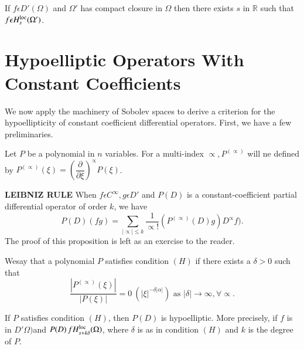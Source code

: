 \setcounter{coro}{24}
\begin{coro}\label{chap3:sec1:coro3.25}%
  If $f \epsilon D' (\Omega)$ and $\Omega'$ has compact closure
  in $\Omega$ then there exists $s$ in $\mathbb{R}$ such that $f
  \epsilon H^{\operatorname{loc}}_s(\Omega')$.   
\end{coro}

\section[Hypoelliptic Operators With Constant
  Coeffi\-cients]{Hypoelliptic Operators With Constant\hfill\break
  Coeffi\-cients}\label{chap3:sec2} %

We now apply the machinery of Sobolev spaces to derive a criterion
for the hypoellipticity of constant coefficient differential
operators. First, we have a few preliminaries.  

\setcounter{defi}{25}
\begin{defi} \label{chap3:sec2:def3.26}%
  Let $P$ be a polynomial in $n$ variables. For a multi-index $\propto,
  P^{(\propto)}$ will ne defined by $P^{(\propto)}(\xi) =
  (\dfrac{\partial}{\partial \xi})^\propto P(\xi) $.  
\end{defi}

\setcounter{prop}{26}
\begin{prop} \label{chap3:sec2:prop3.27}%
  \textbf{LEIBNIZ RULE} When $f \epsilon C^\infty, g
  \epsilon D'$ and $P(D)$ is a constant-coefficient partial
  differential operator of order $k$, we have  
$$
P(D) (fg)  = \sum_{|\propto| \leq k } \dfrac{1}{\propto !}
(P^{(\propto)} (D)g) D^\propto f). 
$$
The proof of this proposition is left as an exercise to the reader. 
\end{prop}

\setcounter{defi}{27}
\begin{defi}\label{chap3:sec2:def3.28} %
  We\pageoriginale say that a polynomial $P$ satisfies condition $(H)$ if there
  exists a $\delta > 0$ such that  
  $$
  \frac{|P^{(\propto)}(\xi)|}{|P(\xi)|}= 0~
  (|\xi|^{-\delta|\alpha|})\text{ as }|\delta| \to \infty, \forall
  \propto.  
  $$
\end{defi}

\setcounter{thm}{28}
\begin{thm}[H\"{O}RMANDER]\label{chap3:sec2:def3.29}%
  If $P$ satisfies condition $(H)$,
    then $P(D)$ is hypoelliptic. More precisely, if $f$ is in $D'
    \Omega)$and $P(D) \,f H^{\operatorname{loc}}_{s+k \delta}(\Omega)$, where $\delta$
    is as in condition $(H)$ and $k$ is the degree of $P$.  
\end{thm}

